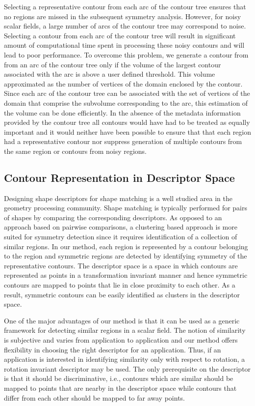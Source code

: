\documentclass[review,journal]{vgtc}         %
\begin{document}
Selecting a representative contour from each arc of the contour tree ensures that no regions
are missed in the subsequent symmetry analysis. However, for noisy scalar fields, a large
number of arcs of the contour tree may correspond to noise. Selecting a contour from each
arc of the contour tree will result in significant amount of computational time spent in
processing these noisy contours and will lead to poor performance. To overcome this problem,
we generate a contour from from an arc of the contour tree only if the volume of the largest
contour associated with the arc is above a user defined threshold. This volume approximated
as the number of vertices of the domain enclosed by the contour. Since each arc of the contour
tree can be associated with the set of vertices of the domain that comprise the subvolume 
corresponding to the arc, this estimation of the volume can be done efficiently.
In the absence of the metadata information provided by the contour tree all contours would
have had to be treated as equally important and it would neither have been possible to ensure
that that each region had a representative contour nor suppress generation of
multiple contours from the same region or contours from noisy regions.
\subsection{Contour Representation in Descriptor Space}
Designing shape descriptors for shape matching is a well studied area in the 
geometry processing community. Shape matching is typically performed for pairs
of shapes by comparing the corresponding descriptors. As opposed to an approach based
on pairwise comparisons, a clustering based approach is more suited for symmetry
detection since it requires identification of a collection of similar regions.
In our method, each region is represented by a contour belonging to the region and symmetric
regions are detected by identifying symmetry of the representative contours. The descriptor
space is a space in which contours are represented as points in a transformation invariant
manner and hence symmetric contours are mapped to points that lie in close proximity to
each other. As a result, symmetric contours can be easily identified as clusters in the descriptor
space.

One of the major advantages of our method is that it can be used as a generic framework
for detecting similar regions in a scalar field. The notion of similarity is subjective
and varies from application to application and our method offers flexibility in choosing
the right descriptor for an application. Thus, if an application is interested in identifying
similarity only with respect to rotation, a rotation invariant descriptor may be used.
The only prerequisite on the descriptor is that it should be discriminative, i.e., contours
which are similar should be mapped to points that are nearby in the descriptor space while
contours that differ from each other should be mapped to far away points.
\end{document}
